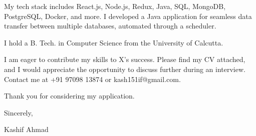 \documentclass{article}
\newcommand\companyName{X}
\begin{document}
My tech stack includes React.js, Node.js, Redux, Java, SQL, MongoDB, PostgreSQL, Docker, and more. I developed a Java application for seamless data transfer between multiple databases, automated through a scheduler.

I hold a B. Tech. in Computer Science from the University of Calcutta.

I am eager to contribute my skills to \companyName's success. Please find my CV attached, and I would appreciate the opportunity to discuss further during an interview. Contact me at +91 97098 13874 or kash151if@gmail.com.

Thank you for considering my application.


\bigskip %

Sincerely,

\vspace{20pt} %
Kashif Ahmad
\end{document}

